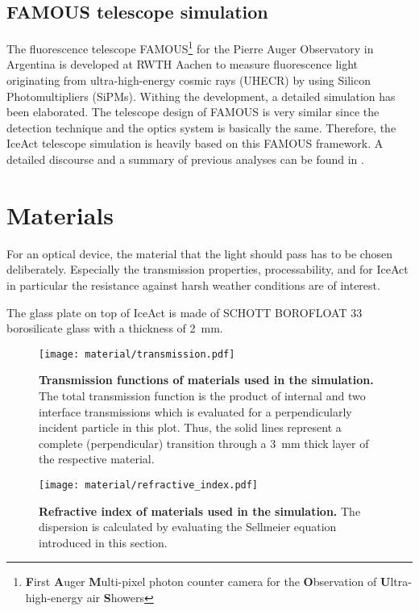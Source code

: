 \subsection{FAMOUS telescope simulation}
The fluorescence telescope FAMOUS\footnote{\textbf{F}irst \textbf{A}uger \textbf{M}ulti-pixel
photon counter camera for the \textbf{O}bservation of \textbf{U}ltra-high-energy air \textbf{S}howers} for the Pierre Auger Observatory in Argentina is developed at RWTH Aachen to measure fluorescence light originating from ultra-high-energy cosmic rays (UHECR) by using Silicon Photomultipliers (SiPMs). Withing the development, a detailed \geant simulation has been elaborated. \cite{famous:sim_github,famous:sim_github} The telescope design of FAMOUS is very similar since the detection technique and the optics system is basically the same. Therefore, the IceAct telescope simulation is heavily based on this FAMOUS \geant framework. A detailed discourse and a summary of previous analyses can be found in \cite{famous:niggemann}.

\section{Materials}

For an optical device, the material that the light should pass has to be chosen deliberately. Especially the transmission properties, processability, and for IceAct in particular the resistance against harsh weather conditions are of interest.

The glass plate on top of IceAct is made of SCHOTT BOROFLOAT\textsuperscript{\textregistered} 33 borosilicate glass with a thickness of \SI{2}{\milli\meter}. \cite{iceact:borosilicate:datasheet}

\begin{figure}[h]
	\centering
	\texttt{[image: material/transmission.pdf]}
	\caption[Transmission of used materials]{\textbf{Transmission functions of materials used in the simulation.} The total transmission function is the product of internal and two interface transmissions which is evaluated for a perpendicularly incident particle in this plot. Thus, the solid lines represent a complete (perpendicular) transition through a \SI{3}{\milli\meter} thick layer of the respective material.}
	\label{iceact:model:material:transmission}	
\end{figure}

\begin{figure}[h]
	\centering
	\texttt{[image: material/refractive\_index.pdf]}
	\caption[Refractive index of used materials]{\textbf{Refractive index of materials used in the simulation.} The dispersion is calculated by evaluating the Sellmeier equation introduced in this section.}
	\label{iceact:model:material:refractive_index}	
\end{figure}

